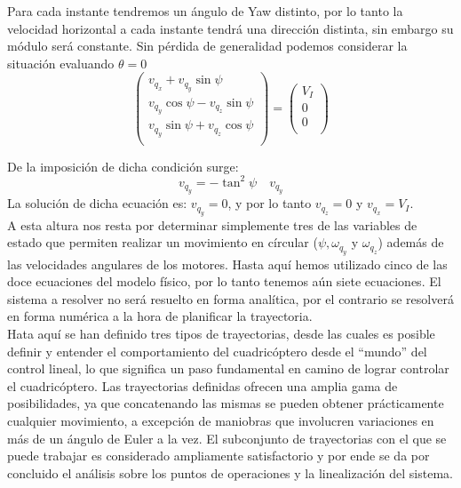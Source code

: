 \documentclass[main]{subfiles}
\begin{document}
Para cada instante tendremos un \'angulo de Yaw distinto, por lo tanto la velocidad horizontal a cada instante tendr\'a una direcci\'on distinta, sin embargo su m\'odulo ser\'a constante. Sin p\'erdida de generalidad podemos considerar la situaci\'on evaluando $\theta = 0$
\begin{equation}
\label{eq:vel_theta}
\left(\begin{array}{c}
v_{q_x}+v_{q_y}\sin\psi\\
v_{q_y}\cos\psi-v_{q_z}\sin\psi\\
v_{q_y}\sin\psi+v_{q_z}\cos\psi\\
\end{array}\right)=\left(\begin{array}{c}
V_{I}\\
0\\
0\\
\end{array}\right)
\end{equation}	

De la imposici\'on de dicha condici\'on surge:
\begin{equation}
v_{q_y} = - \tan^2\psi \quad v_{q_y}
\end{equation}
La soluci\'on de dicha ecuaci\'on es: $v_{q_y} = 0$, y por lo tanto $v_{q_z} = 0$ y $v_{q_x} = V_I$.\\

A esta altura nos resta por determinar simplemente tres de las variables de estado que permiten realizar un movimiento en c\'ircular ($\psi, \omega_{q_y}$ y $\omega_{q_z}$) adem\'as de las velocidades angulares de los motores. Hasta aqu\'i hemos utilizado cinco de las doce ecuaciones del modelo f\'isico, por lo tanto tenemos a\'un siete ecuaciones. El sistema a resolver no ser\'a resuelto en forma anal\'itica, por el contrario se resolver\'a en forma num\'erica a la hora de planificar la trayectoria.\\[20pt]

Hata aqu\'i se han definido tres tipos de trayectorias, desde las cuales es posible definir y entender el comportamiento del cuadric\'optero desde el ``mundo'' del control lineal, lo que significa un paso fundamental en camino de lograr controlar el cuadric\'optero. Las trayectorias definidas ofrecen una amplia gama de posibilidades, ya que concatenando las mismas se pueden obtener pr\'acticamente cualquier movimiento, a excepci\'on de maniobras que involucren variaciones en m\'as de un \'angulo de Euler a la vez. El subconjunto de trayectorias con el que se puede trabajar es considerado ampliamente satisfactorio y por ende se da por concluido el an\'alisis sobre los puntos de operaciones y la linealizaci\'on del sistema. 
\end{document}
